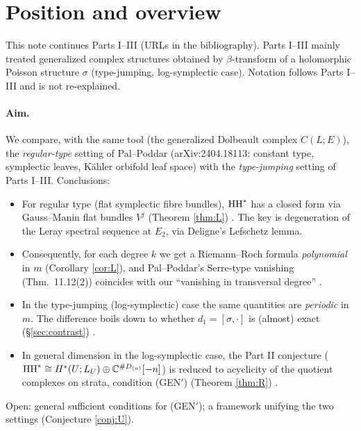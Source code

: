 \section{Position and overview}\label{sec:intro}
This note continues Parts I--III \cite{PartI,PartII,PartIII} (URLs in the bibliography). Parts I--III mainly treated generalized complex structures obtained by $\beta$-transform of a holomorphic Poisson structure $\sigma$ (type-jumping, log-symplectic case). Notation follows Parts I--III and is not re-explained.

\paragraph{Aim.}
We compare, with the same tool (the generalized Dolbeault complex $C(L;E)$), the \emph{regular-type} setting of Pal--Poddar (arXiv:2404.18113: constant type, symplectic leaves, Kähler orbifold leaf space) with the \emph{type-jumping} setting of Parts I--III. Conclusions:
\begin{itemize}
\item For regular type (flat symplectic fibre bundles), $\mathrm{HH}^*$ has a closed form via Gauss--Manin flat bundles $V^j$ (Theorem \ref{thm:L}) \tP. The key is degeneration of the Leray spectral sequence at $E_2$, via Deligne's Lefschetz lemma.
\item Consequently, for each degree $k$ we get a Riemann--Roch formula \emph{polynomial} in $m$ (Corollary \ref{cor:L}), and Pal--Poddar's Serre-type vanishing (Thm.\ 11.12(2)) coincides with our ``vanishing in transversal degree'' \tP.
\item In the type-jumping (log-symplectic) case the same quantities are \emph{periodic} in $m$. The difference boils down to whether $d_1=[\sigma,\cdot]$ is (almost) exact (\S\ref{sec:contrast}) \tP\tV.
\item In general dimension in the log-symplectic case, the Part II conjecture ($\mathrm{HH}^*\cong H^*(U;L_U)\oplus\mathbb C^{\#D_{(n)}}[-n]$) is reduced to acyclicity of the quotient complexes on strata, condition (GEN$'$) (Theorem \ref{thm:R}) \tP.
\end{itemize}
Open: general sufficient conditions for (GEN$'$); a framework unifying the two settings (Conjecture \ref{conj:U}).


